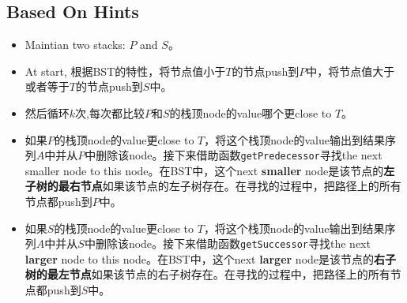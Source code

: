 \subsection{Based On Hints}
\begin{itemize}
\item Maintian two stacks: $P$ and $S$。
\item At start, 根据BST的特性，将节点值小于$T$的节点push到$P$中，将节点值大于或者等于$T$的节点push到$S$中。
\item 然后循环$k$次,每次都比较$P$和$S$的栈顶node的value哪个更close to $T$。
\item 如果$P$的栈顶node的value更close to $T$，将这个栈顶node的value输出到结果序列$A$中并从$P$中删除该node。接下来借助函数\texttt{getPredecessor}寻找the next smaller node to this node。在BST中，这个next \textbf{smaller} node是该节点的\textbf{左子树的最右节点}如果该节点的左子树存在。在寻找的过程中，把路径上的所有节点都push到$P$中。
\item 如果$S$的栈顶node的value更close to $T$，将这个栈顶node的value输出到结果序列$A$中并从$S$中删除该node。接下来借助函数\texttt{getSuccessor}寻找the next \textbf{larger} node to this node。在BST中，这个next \textbf{larger} node是该节点的\textbf{右子树的最左节点}如果该节点的右子树存在。在寻找的过程中，把路径上的所有节点都push到$S$中。
\end{itemize}

